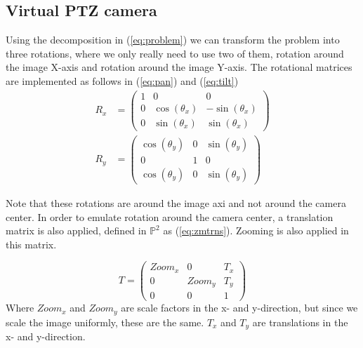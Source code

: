 \subsection{Virtual PTZ camera}
Using the decomposition in (\ref{eq:problem}) we can transform the problem into three rotations, where we only really need to use two of them, rotation around the image X-axis and rotation around the image Y-axis. The rotational matrices are implemented as follows in (\ref{eq:pan}) and (\ref{eq:tilt})
	\begin{align}
		R_x &=\begin{pmatrix}1 & 0 & 0 \\
			0 & \cos(\theta_x) & -\sin(\theta_x) \\
			0 & \sin(\theta_x) & \sin(\theta_x)
		\end{pmatrix} \label{eq:pan}\\ 
		R_y&=\begin{pmatrix} \cos(\theta_y) & 0 & \sin(\theta_y) \\
			0 & 1 & 0 \\
			\cos(\theta_y) & 0 & \sin(\theta_y)
		\end{pmatrix} \label{eq:tilt}
	\end{align}

	Note that these rotations are around the image axi and not around the camera center. In order to emulate rotation around the camera center, a translation matrix is also applied, defined in $\mathbb{P}^2$ as (\ref{eq:zmtrns}). Zooming is also applied in this matrix.

	\begin{equation}
		T=\begin{pmatrix} 
			Zoom_x & 0 & T_x \\ 
			0 & Zoom_y & T_y \\ 
			0 & 0 & 1 
		\end{pmatrix} \label{eq:zmtrns}
	\end{equation}
Where $Zoom_x$ and $Zoom_y$ are scale factors in the x- and y-direction, but since we scale the image uniformly, these are the same. $T_x$ and $T_y$ are translations in the x- and y-direction.
